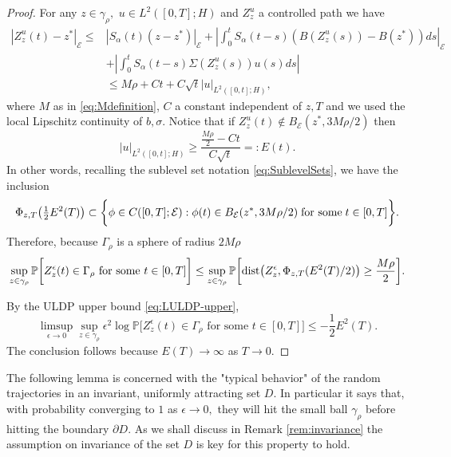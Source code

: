 \documentclass[10pt, reqno]{amsart}
\newcommand{\pr}{\mathbb{P}}
\newcommand{\e}{\mathcal{E}}
\theoremstyle{definition}
\numberwithin{lem}{section}
\numberwithin{cor}{section}
\numberwithin{prop}{section}
\numberwithin{thm}{section}
\numberwithin{dfn}{section}
\begin{document}
\begin{proof}
    For any $z \in \gamma_\rho,$ $u \in L^2([0,T];H)$ and $Z_z^u$ a controlled path we have
    \begin{align*}
        |Z^{u}_z(t) - z^*|_\e \leq &|S_\alpha(t)(z - z^*)|_\e + \left| \int_0^t S_\alpha(t-s) ( B(Z^{u}_z(s)) - B(z^*))ds\right|_\e \nonumber\\
        &+ \left| \int_0^t S_\alpha(t-s) \Sigma(Z^{u}_z(s))u(s)ds \right| \nonumber\\
        &\leq M \rho + Ct + C \sqrt{t}|u|_{L^2([0,t];H)},
    \end{align*}
    where $M$ as in \eqref{eq:Mdefinition}, $C$ a constant independent of $z,T$ and we used the local Lipschitz continuity of $b, \sigma$.
    Notice that if $Z^u_z(t)\notin B_\e(z^*, 3M\rho/2)$ then 
    \begin{equation*}
        |u|_{L^2([0,t];H)} \geq \frac{\frac{ M\rho}{2} - Ct}{C\sqrt{t}} =: E(t). 
    \end{equation*}
     In other words, recalling the sublevel set notation \eqref{eq:SublevelSets}, we have the inclusion     $$\Phi_{z,T}\big(\tfrac{1}{2}E^2(T)\big)\subset\bigg\{ \phi\in C([0,T];\e): \phi(t)\in    B_\e(z^*, 3M\rho/2)\;\textnormal{for some}\;t\in[0,T]\bigg\}.$$
   Therefore, because $\Gamma_\rho$ is a sphere of radius $2M\rho$
    \begin{equation*}
        \sup_{z \in \gamma_\rho} \pr \bigg[ Z^\epsilon_z(t) \in \Gamma_\rho \text{ for some } t \in [0,T] \bigg] 
        \leq \sup_{z \in \gamma_\rho} \pr  \bigg[\textnormal{dist}\big(Z^\epsilon_z, \Phi_{z,T}(E^2(T)/2)\big) \geq \frac{M\rho}{2} \bigg] .
    \end{equation*}
    
    By the ULDP upper bound \eqref{eq:LULDP-upper},
    \begin{equation*}
        \limsup_{\epsilon \to 0} \sup_{z \in \gamma_\rho} \epsilon^2 \log \pr\bigg[Z^{\epsilon}_z(t) \in \Gamma_\rho \text{ for some } t \in [0,T] \bigg]  \leq -\frac{1}{2}E^2(T).
    \end{equation*}
    The conclusion follows because $E(T) \to \infty$ as $T \to 0$.
\end{proof}



The following lemma is concerned with the "typical behavior" of the random trajectories in an invariant, uniformly attracting set $D$. In particular it says that, with probability converging to $1$ as $\epsilon\to 0,$ they will hit the small ball $\gamma_\rho$ before hitting the boundary $\partial D.$ As we shall discuss in Remark \ref{rem:invariance} the assumption on invariance of the set $D$ is key for this property to hold.
\end{document}
